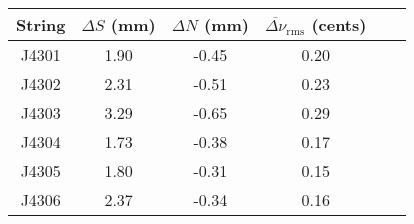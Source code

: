 \begin{tabular}{cccccc}
\toprule
String & $\Delta S$ (mm) & $\Delta N$ (mm) & $\overline{\Delta \nu}_\text{rms}$ (cents) \\
\midrule
J4301 & 1.90 & -0.45 & 0.20 \\
J4302 & 2.31 & -0.51 & 0.23 \\
J4303 & 3.29 & -0.65 & 0.29 \\
J4304 & 1.73 & -0.38 & 0.17 \\
J4305 & 1.80 & -0.31 & 0.15 \\
J4306 & 2.37 & -0.34 & 0.16 \\
\bottomrule
\end{tabular}

